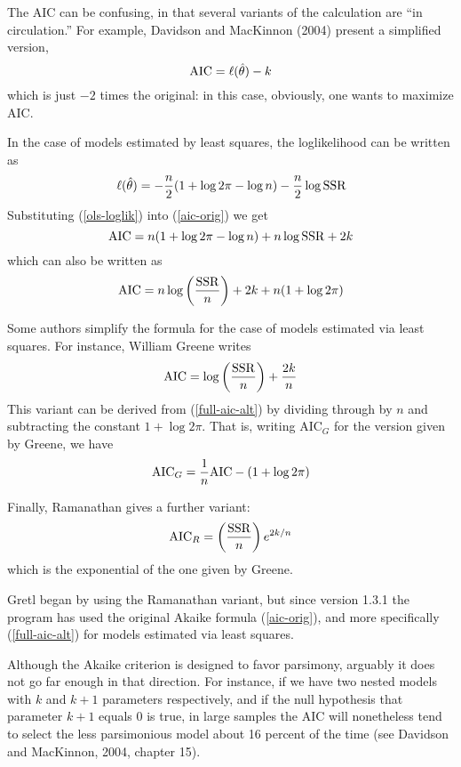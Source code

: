 The AIC can be confusing, in that several variants of the calculation
are ``in circulation.''  For example, Davidson and MacKinnon (2004)
present a simplified version,
%
\[
{\rm AIC} = \ell(\hat{\theta}) - k
\]
%
which is just $-2$ times the original: in this case, obviously, one
wants to maximize AIC.

In the case of models estimated by least squares, the loglikelihood
can be written as
%
\begin{equation}
\label{ols-loglik}
\ell(\hat{\theta}) = -\frac{n}{2}(1 + \log 2\pi - \log n)
 - \frac{n}{2} \log {\rm SSR}
\end{equation}
%
Substituting (\ref{ols-loglik}) into (\ref{aic-orig}) we get
%
\[
{\rm AIC} = n(1 + \log 2\pi - \log n) + n\log {\rm SSR} + 2k
\]
%
which can also be written as
%
\begin{equation}
\label{full-aic-alt}
{\rm AIC} = n\log \left( \frac{\rm SSR}{n} \right) + 2k + 
  n(1 + \log 2\pi)
\end{equation}
%

Some authors simplify the formula for the case of models estimated
via least squares.  For instance, William Greene writes
%
\begin{equation}
\label{aic-greene}
{\rm AIC} = \log \left( \frac{\rm SSR}{n} \right) + \frac{2k}{n}
\end{equation}
%
This variant can be derived from (\ref{full-aic-alt}) by dividing
through by $n$ and subtracting the constant $1 + \log 2\pi$.  That is,
writing AIC$_G$ for the version given by Greene, we have
%
\[
{\rm AIC}_G = \frac{1}{n} {\rm AIC} - (1 + \log 2\pi)
\]
%

Finally, Ramanathan gives a further variant:
%
\[
{\rm AIC}_R = \left( \frac{\rm SSR}{n} \right) e^{2k/n}
\]
%
which is the exponential of the one given by Greene.  

Gretl began by using the Ramanathan variant, but since version 1.3.1
the program has used the original Akaike formula (\ref{aic-orig}), and
more specifically (\ref{full-aic-alt}) for models estimated via least
squares.

\vspace{1ex}

Although the Akaike criterion is designed to favor parsimony, arguably
it does not go far enough in that direction.  For instance, if we have
two nested models with $k$ and $k+1$ parameters respectively, and if
the null hypothesis that parameter $k+1$ equals 0 is true, in large
samples the AIC will nonetheless tend to select the less parsimonious
model about 16 percent of the time (see Davidson and MacKinnon, 2004,
chapter 15).

